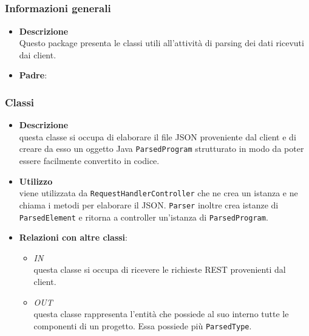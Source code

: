 \subsection{}
\label{\nogloxy{swedesigner::server::parser}}
\subsubsection{Informazioni generali}
\begin{itemize}
\item \textbf{Descrizione}\\
Questo package presenta le classi utili all'attività di parsing dei dati ricevuti dai client.
\item \textbf{Padre}: \hyperref[\nogloxy{swedesigner::server}]{}
\end{itemize}
\subsubsection{Classi}
\label{\nogloxy{swedesigner::server::parser::Parser}}
\begin{itemize}
\item \textbf{Descrizione}\\
questa classe si occupa di elaborare il file JSON proveniente dal client e di creare da esso un oggetto Java \texttt{ParsedProgram} strutturato in modo da poter essere facilmente convertito in codice.
\item \textbf{Utilizzo}\\
viene utilizzata da \texttt{RequestHandlerController} che ne crea un istanza e ne chiama i metodi per elaborare il JSON. \texttt{Parser} inoltre crea istanze di \texttt{ParsedElement} e ritorna a controller un'istanza di \texttt{ParsedProgram}.
\item \textbf{Relazioni con altre classi}:
\begin{itemize}
\item \textit{IN} \hyperref[\nogloxy{swedesigner::server::controller::RequestHandlerController}]{}\\
questa classe si occupa di ricevere le richieste REST provenienti dal client.
\item \textit{OUT} \hyperref[\nogloxy{swedesigner::server::project::ParsedProgram}]{}\\
questa classe rappresenta l'entità che possiede al suo interno tutte le componenti di un progetto. Essa possiede più \texttt{ParsedType}.
\end{itemize}
\end{itemize}
